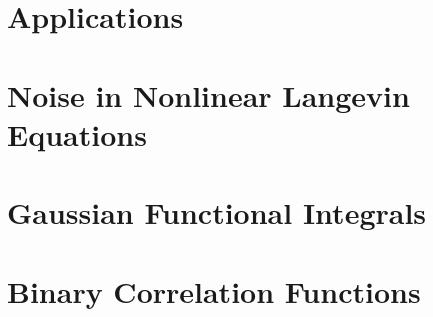 \documentclass[12pt,Bold,letterpaper]{mcgilletdclass}
\begin{document}
\chapter{Applications}
%


\appendix

\chapter{Noise in Nonlinear Langevin Equations}


\chapter{Gaussian Functional Integrals}


\chapter{Binary Correlation Functions}





\end{document}

